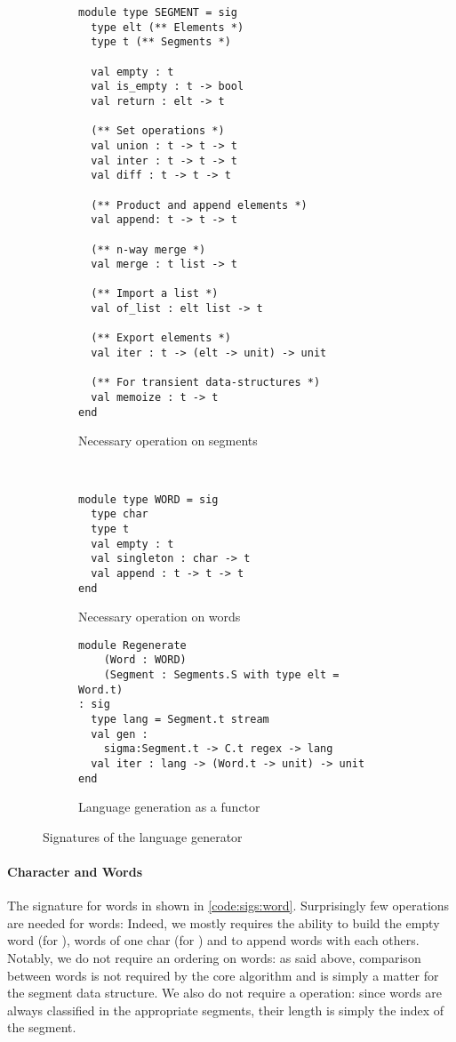 \begin{figure}[b]
  \centering
  \begin{subfigure}{0.44\linewidth}
\begin{lstlisting}[basicstyle=\scriptsize\ttfamily]
module type SEGMENT = sig
  type elt (** Elements *)
  type t (** Segments *)

  val empty : t
  val is_empty : t -> bool
  val return : elt -> t

  (** Set operations *)
  val union : t -> t -> t
  val inter : t -> t -> t
  val diff : t -> t -> t

  (** Product and append elements *)
  val append: t -> t -> t

  (** n-way merge *)
  val merge : t list -> t

  (** Import a list *)
  val of_list : elt list -> t

  (** Export elements *)
  val iter : t -> (elt -> unit) -> unit

  (** For transient data-structures *)
  val memoize : t -> t
end
\end{lstlisting}
    \caption{Necessary operation on segments}
    \label{code:sigs:segment}
  \end{subfigure}~
  \begin{subfigure}{0.57\linewidth}
\begin{lstlisting}[basicstyle=\scriptsize\ttfamily]
module type WORD = sig
  type char
  type t
  val empty : t
  val singleton : char -> t
  val append : t -> t -> t
end
\end{lstlisting}
    \caption{Necessary operation on words}
    \label{code:sigs:word}
\begin{lstlisting}[basicstyle=\scriptsize\ttfamily]
module Regenerate
    (Word : WORD)
    (Segment : Segments.S with type elt = Word.t)
: sig
  type lang = Segment.t stream
  val gen : 
    sigma:Segment.t -> C.t regex -> lang
  val iter : lang -> (Word.t -> unit) -> unit
end
\end{lstlisting}
    \caption{Language generation as a functor}
    \label{code:sigs:regen}
  \end{subfigure}
  \caption{Signatures of the language generator}
  \label{code:sigs}
\end{figure}

\paragraph{Character and Words}

The signature for words in shown in \autoref{code:sigs:word}.
Surprisingly few operations are needed for words: Indeed, we mostly requires the ability to build the empty word (for ),
words of one char (for ) and to append words
with each others.
Notably, we do not require an ordering on words: as said above, comparison between words is not required by the core algorithm and is simply a matter for the segment
data structure.
We also do not require a  operation: since words are always
classified in the appropriate segments, their length is simply the index
of the segment.

